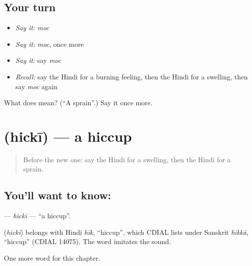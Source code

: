 \subsection*{Your turn}
\begin{itemize}
\raggedright
  \item \emph{Say it:} \emph{moc}
  \item \emph{Say it:} \emph{moc}, once more
  \item \emph{Say it:} say \emph{moc}
  \item \emph{Recall:} say the Hindi for a burning feeling, then the Hindi for a swelling, then say \emph{moc} again
\end{itemize}

\begin{tcolorbox}[breakable,colback=teal!4,colframe=teal!35!black,title={Before you move on}]
What does  mean? (\textquotedblleft{}A sprain\textquotedblright{}.) Say it once more.
\end{tcolorbox}
\section[\texorpdfstring{\hi{हिचकी} (hickī)}{हिचकी (hickī)}]{ (hickī) — a hiccup}

\label{lesson:HI-C275-hicki}



\begin{quote}
Before the new one: say the Hindi for a swelling, then the Hindi for a sprain.
\end{quote}

\subsection*{You'll want to know: }
\textbf{} — \emph{hickī} — \textquotedblleft{}a hiccup\textquotedblright{}.

\begin{cousinweb}
\textbf{} (\emph{hickī}) belongs with Hindi \emph{hīk}, \textquotedblleft{}hiccup\textquotedblright{}, which CDIAL lists under Sanskrit \emph{hikkā}, \textquotedblleft{}hiccup\textquotedblright{} (CDIAL 14075). The word imitates the sound.
\end{cousinweb}

\begin{grammarlens}[title={What you've built}]
One more word for this chapter.
\end{grammarlens}

